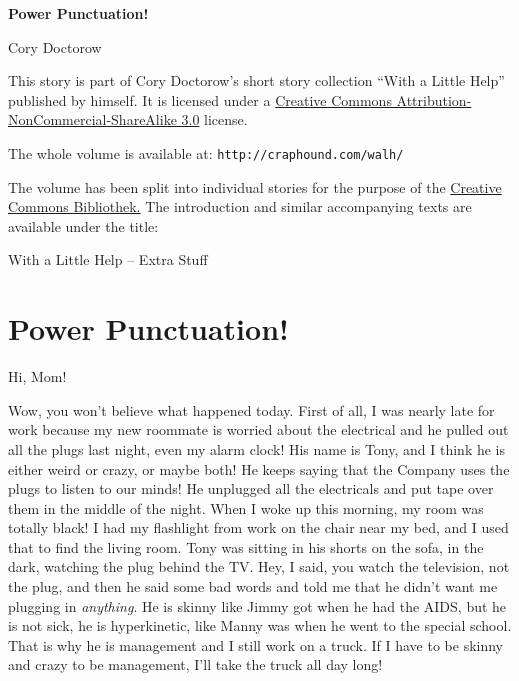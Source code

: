 


\raggedbottom

\begin{center}
\textbf{\huge\textsf{Power Punctuation!}}

\medskip
Cory Doctorow

\end{center}

\bigskip

\begin{flushleft}
This story is part of Cory Doctorow’s short story collection
“With a Little Help” published by himself. It is licensed under a
\href{http://creativecommons.org/licenses/by-nc-sa/}
{Creative Commons Attribution-NonCommercial-ShareAlike 3.0} license.

\bigskip

The whole volume is available at:
\texttt{http://craphound.com/walh/}

\medskip

The volume has been split into individual stories for the purpose of the
\href{http://ccbib.org}{Creative Commons Bibliothek.}
The introduction and similar accompanying texts are available under the 
title:
\end{flushleft}
\begin{center}
With a Little Help -- Extra Stuff
\end{center}

\newpage

\section{Power Punctuation!}

Hi, Mom!

Wow, you won't believe what happened today. First of all, I was nearly 
late for work because my new roommate is worried about the electrical 
and he pulled out all the plugs last night, even my alarm clock! His 
name is Tony, and I think he is either weird or crazy, or maybe both! 
He keeps saying that the Company uses the plugs to listen to our minds! 
He unplugged all the electricals and put tape over them in the middle 
of the night. When I woke up this morning, my room was totally black! I 
had my flashlight from work on the chair near my bed, and I used that 
to find the living room. Tony was sitting in his shorts on the sofa, in 
the dark, watching the plug behind the TV. Hey, I said, you watch the 
television, not the plug, and then he said some bad words and told me 
that he didn't want me plugging in \emph{anything}. He is skinny like 
Jimmy got when he had the AIDS, but he is not sick, he is hyperkinetic, 
like Manny was when he went to the special school. That is why he is 
management and I still work on a truck. If I have to be skinny and 
crazy to be management, I'll take the truck all day long!

